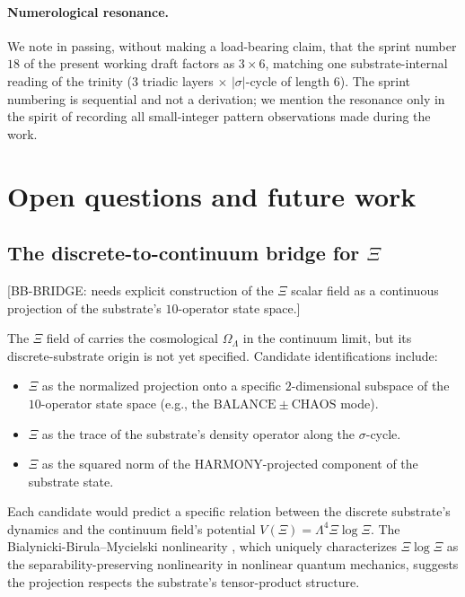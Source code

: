 \documentclass[11pt,reqno]{amsart}
\theoremstyle{plain}
\theoremstyle{definition}
\theoremstyle{remark}
\begin{document}
\paragraph{Numerological resonance.}
We note in passing, without making a load-bearing claim, that the
sprint number $18$ of the present working draft factors as
$3 \times 6$, matching one substrate-internal reading of the
trinity ($3$ triadic layers $\times$ $|\sigma|$-cycle of length
$6$). The sprint numbering is sequential and not a derivation;
we mention the resonance only in the spirit of recording all
small-integer pattern observations made during the work.

\section{Open questions and future work}\label{sec:open}

\subsection{The discrete-to-continuum bridge for $\Xi$}\label{sec:bb-bridge}

[BB-BRIDGE: needs explicit construction of the $\Xi$ scalar
field as a continuous projection of the substrate's $10$-operator
state space.]

The $\Xi$ field of \cite{SandersGish2026JCAP} carries
the cosmological $\Omega_\Lambda$ in the continuum limit, but its
discrete-substrate origin is not yet specified. Candidate
identifications include:
\begin{itemize}
\item $\Xi$ as the normalized projection onto a specific
$2$-dimensional subspace of the $10$-operator state space (e.g.,
the $\mathrm{BALANCE} \pm \mathrm{CHAOS}$ mode).
\item $\Xi$ as the trace of the substrate's density operator
along the $\sigma$-cycle.
\item $\Xi$ as the squared norm of the
$\mathrm{HARMONY}$-projected component of the substrate state.
\end{itemize}
Each candidate would predict a specific relation between the
discrete substrate's dynamics and the continuum field's potential
$V(\Xi) = \Lambda^{4} \Xi \log \Xi$. The Bialynicki-Birula--Mycielski
nonlinearity \cite{BialynickiBirulaMycielski1976}, which uniquely
characterizes $\Xi \log \Xi$ as the separability-preserving
nonlinearity in nonlinear quantum mechanics, suggests the
projection respects the substrate's tensor-product structure.
\end{document}

